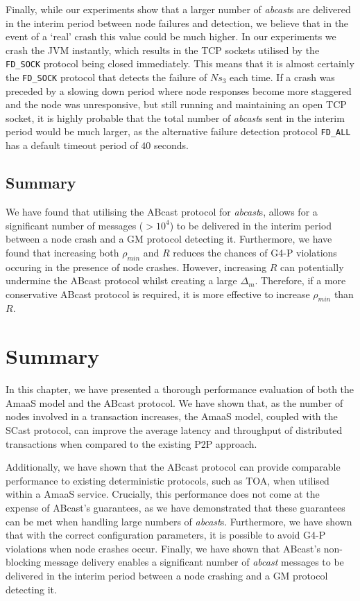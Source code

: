     Finally, while our experiments show that a larger number of \emph{abcast}s are delivered in the interim period between node failures and detection, we believe that in the event of a \textquoteleft{}real' crash this value could be much higher.  In our experiments we crash the JVM instantly, which results in the TCP sockets utilised by the \texttt{FD\_SOCK} protocol being closed immediately.  This means that it is almost certainly the \texttt{FD\_SOCK} protocol that detects the failure of $Ns_3$ each time.  If a crash was preceded by a slowing down period where node responses become more staggered and the node was unresponsive, but still running and maintaining an open TCP socket, it is highly probable that the total number of \emph{abcast}s sent in the interim period would be much larger, as the alternative failure detection protocol \texttt{FD\_ALL} has a default timeout period of $40$ seconds.  
        
    \subsection{Summary}
        We have found that utilising the \textsf{ABcast} protocol for \emph{abcast}s, allows for a significant number of messages ($> 10^4$) to be delivered in the interim period between a node crash and a GM protocol detecting it.  Furthermore, we have found that increasing both $\rho_{min}$ and $R$ reduces the chances of G4-P violations occuring in the presence of node crashes.  However, increasing $R$ can potentially undermine the \textsf{ABcast} protocol whilst creating a large $\Delta_m$.  Therefore, if a more conservative \textsf{ABcast} protocol is required, it is more effective to increase $\rho_{min}$ than $R$.  
        
\section{Summary}
In this chapter, we have presented a thorough performance evaluation of both the \textsf{AmaaS} model and the \textsf{ABcast} protocol.  We have shown that, as the number of nodes involved in a transaction increases, the \textsf{AmaaS} model, coupled with the \textsf{SCast} protocol, can improve the average latency and throughput of distributed transactions when compared to the existing P2P approach.  

Additionally, we have shown that the \textsf{ABcast} protocol can provide comparable performance to existing deterministic protocols, such as TOA, when utilised within a \textsf{AmaaS} service.  Crucially, this performance does not come at the expense of \textsf{ABcast}'s guarantees, as we have demonstrated that these guarantees can be met when handling large numbers of \emph{abcast}s.  Furthermore, we have shown that with the correct configuration parameters, it is possible to avoid G4-P violations when node crashes occur.  Finally, we have shown that \textsf{ABcast}'s non-blocking message delivery enables a significant number of \emph{abcast} messages to be delivered in the interim period between a node crashing and a GM protocol detecting it.  